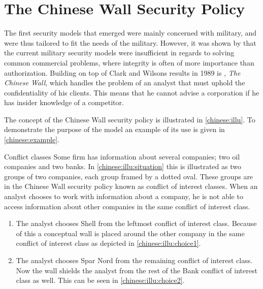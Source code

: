 \section{The Chinese Wall Security Policy}
The first security models that emerged were mainly concerned with military, and were thus tailored to fit the needs of the military.
However, it was shown by \citet{clarkwilson1987commercial} that the current military security models were insufficient in regards to solving common commercial problems, where integrity is often of more importance than authorization.
Building on top of Clark and Wilsons results in 1989 is \citet{brewer1989chinese}, \emph{The Chinese Wall}, which handles the problem of an analyst that must uphold the confidentiality of his clients.
This means that he cannot advise a corporation if he has insider knowledge of a competitor.

The concept of the Chinese Wall security policy is illustrated in \cref{chinese:illu}.
To demonstrate the purpose of the model an example of its use is given in \cref{chinese:example}.

\begin{example}{Conflict classes}\label{chinese:example}
Some firm has information about several companies; two oil companies and two banks.
In \cref{chinese:illu:situation} this is illustrated as two groups of two companies, each group framed by a dotted oval.
These groups are in the Chinese Wall security policy known as conflict of interest classes.
When an analyst chooses to work with information about a company, he is not able to access information about other companies in the same conflict of interest class.

\begin{enumerate}
    \item The analyst chooses Shell from the leftmost conflict of interest class.
    Because of this a conceptual wall is placed around the other company in the same conflict of interest class as depicted in \cref{chinese:illu:choice1}.
    \item The analyst chooses Spar Nord from the remaining conflict of interest class.
    Now the wall shields the analyst from the rest of the Bank conflict of interest class as well.
    This can be seen in \cref{chinese:illu:choice2}.
\end{enumerate}
\end{example}

